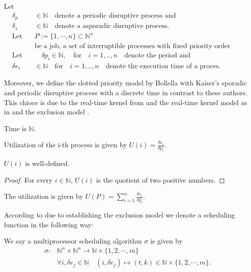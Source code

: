 \begin{definition}
	Let      
	\begin{align} 
	& \delta_p &\in \mathbb{N} \quad \text{denote a periodic disruptive process and}\\
 	&\delta_s &\in \mathbb{N} \quad \text{denote a asporadic disruptive process.}\\
 &\text{Let} \quad & P := \{1, \cdots, n \} \subset \mathbb{N}^n \\
 &\quad & \text{be a job, a set of interruptible processes with fixed priority order ascading.} \\
 	&\text{Let} & \quad  \delta p_i \in \mathbb{N}, \quad \text{for} \quad i = 1,..,n \quad  \text{denote the period and}  \\
 	&\delta e_i & \in \mathbb{N} \quad \text{for} \quad  i = 1,..,n \quad  \text{denote the execution time of a proces}.  
	\end{align}   
\end{definition}

Moreover, we define the slotted priority model by Bollella with Kaiser's sporadic and periodic disruptive process with a discrete time in contrast to these authors.
This chioce is due to the real-time kernel from \cite{PROSA_schedubility_analysis} and the real-time kernel model as in \cite[chp. 5.3]{B97} and the exclusion model \cite[p.12]{B97}.

\begin{definition}
	Time is $\mathbb{N}$.
\end{definition}


\begin{definition}
	Utilization of the i-th process is given by $U(i) = \frac{\delta e_i}{\delta p_i}$.
\end{definition}
\begin{lemma}
$U(i)$ is well-defined.
\end{lemma}
\begin{proof}
For every $i\in \mathbb{N}$, $U(i)$ is the quotient of two positive numbers.
\end{proof}

\begin{definition}
The utilization is given by $U(P)= \sum_{i=1}^n \frac{\delta e_i}{\delta p_i}$.
\end{definition}

According to \cite{B97} due to establishing the exclusion model we denote  a scheduling function in the following way:

\begin{definition}
We say a multiprocessor scheduling algorithm $\sigma$ is given by 
	\begin{align} 
	\sigma: &\mathbb{N}^n \times \mathbb{N}^n \longrightarrow  \mathbb{N} \times \{1,2,\cdots, m\} \\
	&\forall i, \delta e_j \in  \mathbb{N} \quad (i ,\delta e_j)  \mapsto (t,k) \in \mathbb{N}\times \{1,2,\cdots,m\}. 
	\end{align}
\end{definition}


